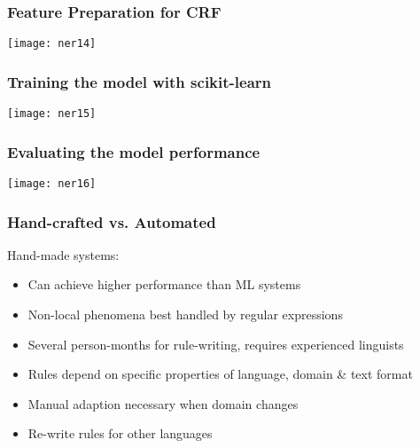 \begin{frame}[fragile]\frametitle{Feature Preparation for CRF}

\begin{center}
\texttt{[image: ner14]}
\end{center}

\end{frame}

\begin{frame}[fragile]\frametitle{Training the model with scikit-learn}

\begin{center}
\texttt{[image: ner15]}
\end{center}

\end{frame}

\begin{frame}[fragile]\frametitle{Evaluating the model  performance}

\begin{center}
\texttt{[image: ner16]}
\end{center}

\end{frame}

\begin{frame}[fragile]\frametitle{Hand-crafted vs. Automated }
Hand-made systems:
  \begin{itemize}
  \item Can achieve higher performance than ML systems
  \item Non-local phenomena best handled by regular expressions
  \item Several person-months for rule-writing, requires experienced linguists
  \item Rules depend on specific properties of language, domain \& text format  
  \item Manual adaption necessary when domain changes
  \item Re-write rules for other languages
  \end{itemize}
\end{frame}


